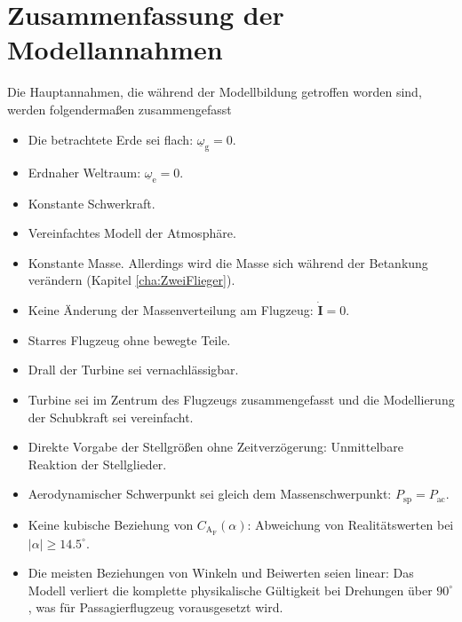 \section{Zusammenfassung der Modellannahmen}
Die Hauptannahmen, die während der Modellbildung getroffen worden sind, werden folgenderma{\ss}en zusammengefasst
\begin{itemize}
\item Die betrachtete Erde sei flach: $\underline{\omega}_\mathrm{g} = 0$.
\item Erdnaher Weltraum: $\underline{\omega}_\mathrm{e} = 0$.
\item Konstante Schwerkraft.
\item Vereinfachtes Modell der Atmosphäre. 
\item Konstante Masse. Allerdings wird die Masse sich während der Betankung verändern (Kapitel \ref{cha:ZweiFlieger}).
\item Keine Änderung der Massenverteilung am Flugzeug: $\dot{\textbf{I}} = 0$.
\item Starres Flugzeug ohne bewegte Teile.
\item Drall der Turbine sei vernachlässigbar.
\item Turbine sei im Zentrum des Flugzeugs zusammengefasst und die Modellierung der Schubkraft sei vereinfacht.
\item Direkte Vorgabe der Stellgrö{\ss}en ohne Zeitverzögerung: Unmittelbare Reaktion der Stellglieder.
\item Aerodynamischer Schwerpunkt sei gleich dem Massenschwerpunkt: $P_\mathrm{sp} = P_\mathrm{ac}$.
\item Keine kubische Beziehung von $C_\mathrm{A_F}(\alpha)$: Abweichung von Realitätswerten bei $|\alpha|\geq 14.5^{\circ}$.
\item Die meisten Beziehungen von Winkeln und Beiwerten seien linear: Das Modell verliert die komplette physikalische Gültigkeit bei Drehungen über $90^{\circ}$, was für Passagierflugzeug vorausgesetzt wird.

\end{itemize}

